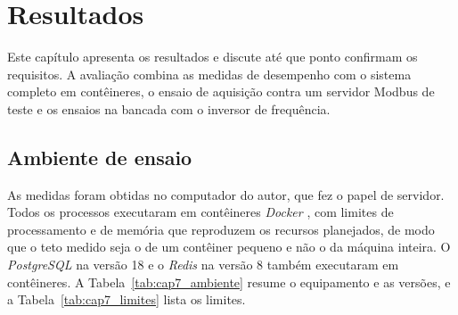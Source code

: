\newpage
\section{Resultados}

\newcommand{\graficoreservado}[3]{%
\begin{figure}[H]
    \centering
    \caption{#1}
    \label{#2}
    \vspace{0.3cm}
    \fbox{\parbox[c][4.2cm][c]{0.85\textwidth}{\centering Espaço reservado para o gráfico\\ #3}}
    \vspace{0.2cm} \\
    Fonte: Autor.
\end{figure}}

\par Este capítulo apresenta os resultados e discute até que ponto confirmam os requisitos. A avaliação combina as medidas de desempenho com o sistema completo em contêineres, o ensaio de aquisição contra um servidor Modbus de teste e os ensaios na bancada com o inversor de frequência.

\subsection{Ambiente de ensaio}

\par As medidas foram obtidas no computador do autor, que fez o papel de servidor. Todos os processos executaram em contêineres \emph{Docker} \cite{DOCKER_DOCS}, com limites de processamento e de memória que reproduzem os recursos planejados, de modo que o teto medido seja o de um contêiner pequeno e não o da máquina inteira. O \emph{PostgreSQL} \cite{POSTGRESQL_DOCS} na versão 18 e o \emph{Redis} \cite{REDIS_DOCS} na versão 8 também executaram em contêineres. A Tabela~\ref{tab:cap7_ambiente} resume o equipamento e as versões, e a Tabela~\ref{tab:cap7_limites} lista os limites.

